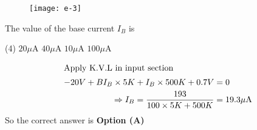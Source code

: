 \begin{enumerate}
	\begin{figure}[H]
		\centering
		\texttt{[image: e-3]}
	\end{figure}
	The value of the base current $I_{B}$ is
{	}
\begin{tasks}(4)
\task[\textbf{A.}] $20 \mu \mathrm{A}$
\task[\textbf{B.}]  $40 \mu \mathrm{A}$
\task[\textbf{C.}] $10 \mu \mathrm{A}$
\task[\textbf{D.}] $100 \mu \mathrm{A}$
\end{tasks}
\begin{answer}
\begin{align*}
\intertext{Apply K.V.L in input section}
-20 V+B I_{B} \times 5 K+I_{B} \times 500 K+0.7 V&=0\\
\Rightarrow I_{B}=\frac{193}{100 \times 5 K+500 K}&=19.3 \mu \mathrm{A}
\end{align*}
So the correct answer is \textbf{Option (A)}
\end{answer}
	
	
	
\end{enumerate}